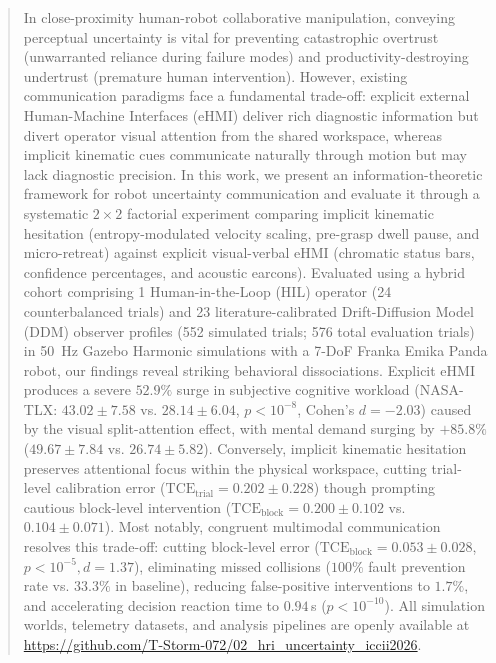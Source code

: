 \documentclass[conference]{IEEEtran}
\begin{document}
\begin{abstract}
In close-proximity human-robot collaborative manipulation, conveying perceptual uncertainty is vital for preventing catastrophic overtrust (unwarranted reliance during failure modes) and productivity-destroying undertrust (premature human intervention). However, existing communication paradigms face a fundamental trade-off: explicit external Human-Machine Interfaces (eHMI) deliver rich diagnostic information but divert operator visual attention from the shared workspace, whereas implicit kinematic cues communicate naturally through motion but may lack diagnostic precision. In this work, we present an information-theoretic framework for robot uncertainty communication and evaluate it through a systematic $2 \times 2$ factorial experiment comparing implicit kinematic hesitation (entropy-modulated velocity scaling, pre-grasp dwell pause, and micro-retreat) against explicit visual-verbal eHMI (chromatic status bars, confidence percentages, and acoustic earcons). Evaluated using a hybrid cohort comprising 1 Human-in-the-Loop (HIL) operator (24 counterbalanced trials) and 23 literature-calibrated Drift-Diffusion Model (DDM) observer profiles (552 simulated trials; 576 total evaluation trials) in 50~Hz Gazebo Harmonic simulations with a 7-DoF Franka Emika Panda robot, our findings reveal striking behavioral dissociations. Explicit eHMI produces a severe $52.9\%$ surge in subjective cognitive workload (NASA-TLX: $43.02 \pm 7.58$ vs. $28.14 \pm 6.04$, $p < 10^{-8}$, Cohen's $d = -2.03$) caused by the visual split-attention effect, with mental demand surging by $+85.8\%$ ($49.67 \pm 7.84$ vs. $26.74 \pm 5.82$). Conversely, implicit kinematic hesitation preserves attentional focus within the physical workspace, cutting trial-level calibration error ($\text{TCE}_{\text{trial}} = 0.202 \pm 0.228$) though prompting cautious block-level intervention ($\text{TCE}_{\text{block}} = 0.200 \pm 0.102$ vs. $0.104 \pm 0.071$). Most notably, congruent multimodal communication resolves this trade-off: cutting block-level error ($\text{TCE}_{\text{block}} = 0.053 \pm 0.028$, $p < 10^{-5}, d = 1.37$), eliminating missed collisions ($100\%$ fault prevention rate vs. $33.3\%$ in baseline), reducing false-positive interventions to $1.7\%$, and accelerating decision reaction time to $0.94$\,s ($p < 10^{-10}$). All simulation worlds, telemetry datasets, and analysis pipelines are openly available at \url{https://github.com/T-Storm-072/02_hri_uncertainty_iccii2026}.
\end{abstract}
\end{document}
